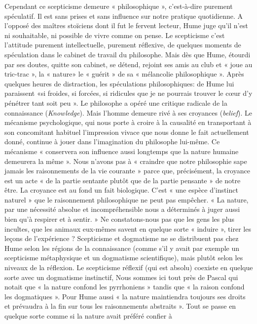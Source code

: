 Cependant ce scepticisme demeure « philosophique »,
c’est-à-dire purement spéculatif. Il est sans prises et sans
influence sur notre pratique quotidienne. A l’opposé des
maîtres stoïciens dont il fut le fervent lecteur, Hume
juge qu’il n’est ni souhaitable, ni possible de vivre comme
on pense. Le scepticisme c’est l’attitude purement intellectuelle, 
purement réflexive, de quelques moments de
spéculation dans le cabinet de travail du philosophe.
Mais dès que Hume, étourdi par ses doutes, quitte son
cabinet, se détend, rejoint ses amis au club et « joue au
tric-trac », la « nature» le « guérit » de sa « mélancolie
philosophique ». Après quelques heures de distraction,
les spéculations philosophiques: de Hume lui paraissent
«si froides, si forcées, si ridicules que je ne pourrais trouver
le cœur d’y pénétrer tant soit peu ». Le philosophe a opéré
une critique radicale de la connaissance ({\it Knowledge}).
Mais l’homme demeure rivé à ses croyances ({\it belief}).
Le mécanisme psychologique, qui nous porte à croire à la
causalité en transportant à son concomitant habituel
l'impression vivace que nous donne le fait actuellement
donné, continue à jouer dans l’imagination du philosophe
lui-même. Ce mécanisme « conservera son influence aussi
longtemps que la nature humaine demeurera la même ».
Nous n’avons pas à « craindre que notre philosophie sape
jamais les raisonnements de la vie courante » parce que,
précisément, la croyance est un acte « de la partie sentante
plutôt que de la partie pensante » de notre être. La croyance
est au fond un fait biologique. C’est « une espèce d’instinct
naturel » que le raisonnement philosophique ne peut pas
empêcher. « La nature, par une nécessité absolue et incompréhensible 
nous a déterminés à juger aussi bien qu’à
respirer et à sentir. » Ne constatons-nous pas que les gens
les plus incultes, que les animaux eux-mêmes savent en
quelque sorte « induire », tirer les leçons de l’expérience ?
Scepticisme et dogmatisme ne se distribuent pas chez
Hume selon les régions de la connaissance (comme s’il
y avait par exemple un scepticisme métaphysique et un
dogmatisme scientifique), mais plutôt selon les niveaux
de la réflexion. Le scepticisme réflexif (qui est absolu)
coexiste en quelque sorte avec un dogmatisme instinctif,
Nous sommes ici tout près de Pascal qui notait que « la
nature confond les pyrrhoniens » tandis que « la raison
confond les dogmatiques ». Pour Hume aussi « la nature
maintiendra toujours ses droits et prévaudra à la fin
sur tous les raisonnements abstraits ». Tout se passe en
quelque sorte comme si la nature avait préféré confier à
